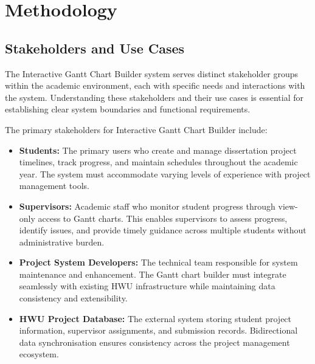\documentclass[12pt,nonacm,acmlarge,titlepage,screen]{acmart}
\begin{document}
\section{Methodology} \label{cha:method}


\subsection{Stakeholders and Use Cases} \label{cha:stakeholders_and_use_case}

The Interactive Gantt Chart Builder system serves distinct stakeholder groups within the academic environment, each with specific needs and interactions with the system. Understanding these stakeholders and their use cases is essential for establishing clear system boundaries and functional requirements.

The primary stakeholders for Interactive Gantt Chart Builder include:
\begin{itemize}
    \item \textbf{Students:} The primary users who create and manage dissertation project timelines, track progress, and maintain schedules throughout the academic year. The system must accommodate varying levels of experience with project management tools.
    \item \textbf{Supervisors:} Academic staff who monitor student progress through view-only access to Gantt charts. This enables supervisors to assess progress, identify issues, and provide timely guidance across multiple students without administrative burden.
    \item \textbf{Project System Developers:} The technical team responsible for system maintenance and enhancement. The Gantt chart builder must integrate seamlessly with existing HWU infrastructure while maintaining data consistency and extensibility.    
    \item \textbf{HWU Project Database:} The external system storing student project information, supervisor assignments, and submission records. Bidirectional data synchronisation ensures consistency across the project management ecosystem.
\end{itemize}
\end{document}
